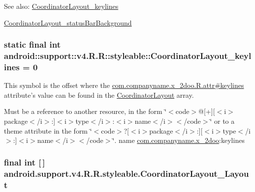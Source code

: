 \begin{Desc}
\item[See also:]\hyperlink{classandroid_1_1support_1_1v4_1_1_r_1_1styleable_c20576c71d93334eef8aed7debc2efde}{CoordinatorLayout\_\-keylines} 

\hyperlink{classandroid_1_1support_1_1v4_1_1_r_1_1styleable_e232b9f25b14bea864d27c7645390f60}{CoordinatorLayout\_\-statusBarBackground} \end{Desc}
\hypertarget{classandroid_1_1support_1_1v4_1_1_r_1_1styleable_c20576c71d93334eef8aed7debc2efde}{
\subsubsection[{CoordinatorLayout\_\-keylines}]{\setlength{\rightskip}{0pt plus 5cm}static final int android::support::v4.R.R::styleable::CoordinatorLayout\_\-keylines = 0}}
\label{classandroid_1_1support_1_1v4_1_1_r_1_1styleable_c20576c71d93334eef8aed7debc2efde}


This symbol is the offset where the \hyperlink{classcom_1_1companyname_1_1x__2doo_1_1_r_1_1attr_320e98ff473b48aed0056a901f21a15b}{com.companyname.x\_\-2doo.R.attr\#keylines} attribute's value can be found in the \hyperlink{classandroid_1_1support_1_1v4_1_1_r_1_1styleable_435a678f97c5e5874614dce39be62fcb}{CoordinatorLayout} array.

Must be a reference to another resource, in the form \char`\"{}$<$code$>$@\mbox{[}+\mbox{]}\mbox{[}$<$i$>$package$<$/i$>$:\mbox{]}$<$i$>$type$<$/i$>$:$<$i$>$name$<$/i$>$$<$/code$>$\char`\"{} or to a theme attribute in the form \char`\"{}$<$code$>$?\mbox{[}$<$i$>$package$<$/i$>$:\mbox{]}\mbox{[}$<$i$>$type$<$/i$>$:\mbox{]}$<$i$>$name$<$/i$>$$<$/code$>$\char`\"{}.  name \hyperlink{namespacecom_1_1companyname_1_1x__2doo}{com.companyname.x\_\-2doo}:keylines \hypertarget{classandroid_1_1support_1_1v4_1_1_r_1_1styleable_002d98b0482bfb71440db629b16e17bf}{
\subsubsection[{CoordinatorLayout\_\-Layout}]{\setlength{\rightskip}{0pt plus 5cm}final int \mbox{[}$\,$\mbox{]} android.support.v4.R.R.styleable.CoordinatorLayout\_\-Layout}}
\label{classandroid_1_1support_1_1v4_1_1_r_1_1styleable_002d98b0482bfb71440db629b16e17bf}


